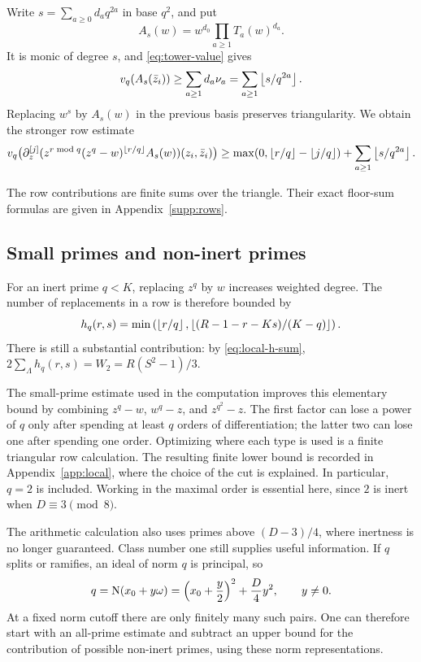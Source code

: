Write $s=\sum_{a\geq0}d_aq^{2a}$ in base $q^2$, and put
\[
 A_s(w)=w^{d_0}\prod_{a\geq1}T_a(w)^{d_a}.
\]
It is monic of degree $s$, and \eqref{eq:tower-value} gives
\[
 v_q(A_s(\bar z_i))\geq
 \sum_{a\geq1}d_a\nu_a
 =\sum_{a\geq1}\left\lfloor s/q^{2a}\right\rfloor.
\]
Replacing $w^s$ by $A_s(w)$ in the previous basis preserves triangularity. We obtain the stronger row estimate
\begin{equation}\label{eq:tower-valuation}
 v_q\bigl(\partial_z^{[j]}(z^{r\bmod q}(z^q-w)^{\left\lfloor r/q\right\rfloor}A_s(w))
                 (z_i,\bar z_i)\bigr)
 \geq\max(0,\left\lfloor r/q\right\rfloor-\left\lfloor j/q\right\rfloor)
         +\sum_{a\geq1}\left\lfloor s/q^{2a}\right\rfloor.
\end{equation}

The row contributions are finite sums over the triangle. Their exact
floor-sum formulas are given in Appendix~\ref{supp:rows}.

\subsection{Small primes and non-inert primes}
For an inert prime $q<K$, replacing $z^q$ by $w$ increases weighted degree. The number of replacements in a row is therefore bounded by
\begin{equation}\label{eq:small-h}
 h_q(r,s)=\min\left(\left\lfloor r/q\right\rfloor,
          \left\lfloor (R-1-r-Ks)/(K-q)\right\rfloor\right).
\end{equation}
There is still a substantial contribution: by \eqref{eq:local-h-sum},
$2\sum_\Lambda h_q(r,s)=W_2=R(S^2-1)/3$.

The small-prime estimate used in the computation improves this elementary bound by combining $z^q-w$, $w^q-z$, and $z^{q^2}-z$. The first factor can lose a power of $q$ only after spending at least $q$ orders of differentiation; the latter two can lose one after spending one order. Optimizing where each type is used is a finite triangular row calculation. The resulting finite lower bound is recorded in Appendix~\ref{app:local}, where the choice of the cut is explained. In particular, $q=2$ is included. Working in the maximal order is essential here, since $2$ is inert when $D\equiv3\pmod8$.

The arithmetic calculation also uses primes above $(D-3)/4$, where inertness is no longer guaranteed. Class number one still supplies useful information. If $q$ splits or ramifies, an ideal of norm $q$ is principal, so
\begin{equation}\label{eq:prime-norm}
 q=\operatorname{N}(x_0+y\omega)=\left(x_0+\frac y2\right)^2+\frac D4y^2,
 \qquad y\ne0.
\end{equation}
At a fixed norm cutoff there are only finitely many such pairs. One can therefore start with an all-prime estimate and subtract an upper bound for the contribution of possible non-inert primes, using these norm representations.

